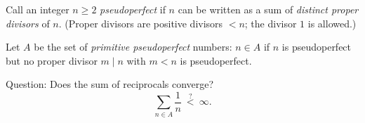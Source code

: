 Call an integer $n\ge 2$ \emph{pseudoperfect} if $n$ can be written as a sum of \emph{distinct proper divisors} of $n$. (Proper divisors are positive divisors $<n$; the divisor $1$ is allowed.)

Let $A$ be the set of \emph{primitive pseudoperfect} numbers: $n\in A$ if $n$ is pseudoperfect but no proper divisor $m\mid n$ with $m<n$ is pseudoperfect.

Question: Does the sum of reciprocals converge?
\[
\sum_{n\in A}\frac{1}{n}\ \stackrel{?}{<}\ \infty.
\]
